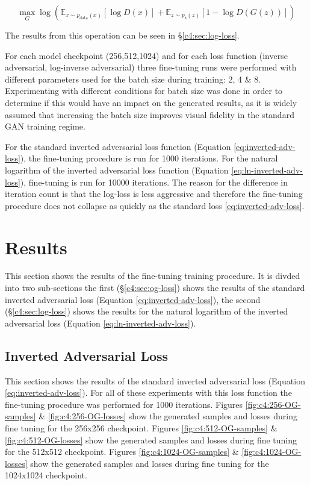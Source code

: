 \begin{equation} 
  \max_{G}\log(\mathbb{E}_{x\sim p_{\text{data}}(x)}[\log{D(x)}] +  \mathbb{E}_{z\sim p_{\text{z}}(z)}[1 - \log{D(G(z))}])
  \label{eq:ln-inverted-adv-loss}
  \end{equation}

The results from this operation can be seen in \S \ref{c4:sec:log-loss}.

For each model checkpoint (256,512,1024) and for each loss function (inverse adversarial, log-inverse adversarial) three fine-tuning runs were performed with different parameters used for the batch size during training: 2, 4 \& 8.
Experimenting with different conditions for batch size was done in order to determine if this would have an impact on the generated results, as it is widely assumed that increasing the batch size improves visual fidelity in the standard GAN training regime. 

For the standard inverted adversarial loss function (Equation \ref{eq:inverted-adv-loss}), the fine-tuning procedure is run for 1000 iterations.
For the natural logarithm of the inverted adversarial loss function (Equation \ref{eq:ln-inverted-adv-loss}), fine-tuning is run for 10000 iterations.
The reason for the difference in iteration count is that the log-loss is less aggressive and therefore the fine-tuning procedure does not collapse as quickly as the standard loss \ref{eq:inverted-adv-loss}.

\section{Results}
\label{c4:sec:results}

This section shows the results of the fine-tuning training procedure. 
It is divded into two sub-sections the first (\S \ref{c4:sec:og-loss}) shows the results of the standard inverted adversarial loss (Equation \ref{eq:inverted-adv-loss}), the second (\S \ref{c4:sec:log-loss}) shows the results for the natural logarithm of the inverted adversarial loss (Equation \ref{eq:ln-inverted-adv-loss}).

\subsection{Inverted Adversarial Loss}
\FloatBarrier

This section shows the results of the standard inverted adversarial loss (Equation \ref{eq:inverted-adv-loss}). For all of these experiments with this loss function the fine-tuning procedure was performed for 1000 iterations.
Figures \ref{fig:c4:256-OG-samples} \& \ref{fig:c4:256-OG-losses} show the generated samples and losses during fine tuning for the 256x256 checkpoint.
Figures \ref{fig:c4:512-OG-samples} \& \ref{fig:c4:512-OG-losses} show the generated samples and losses during fine tuning for the 512x512 checkpoint.
Figures \ref{fig:c4:1024-OG-samples} \& \ref{fig:c4:1024-OG-losses} show the generated samples and losses during fine tuning for the 1024x1024 checkpoint.

